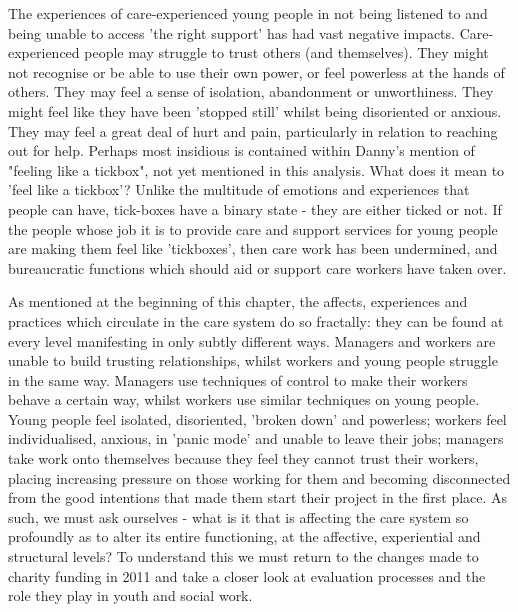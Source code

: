 The experiences of care-experienced young people in not being listened to and being unable to access 'the right support' has had vast negative impacts. Care-experienced people may struggle to trust others (and themselves). They might not recognise or be able to use their own power, or feel powerless at the hands of others. They may feel a sense of isolation, abandonment or unworthiness. They might feel like they have been 'stopped still' whilst being disoriented or anxious. They may feel a great deal of hurt and pain, particularly in relation to reaching out for help. Perhaps most insidious is contained within Danny's mention of "feeling like a tickbox", not yet mentioned in this analysis. What does it mean to 'feel like a tickbox'? Unlike the multitude of emotions and experiences that people can have, tick-boxes have a binary state - they are either ticked or not. If the people whose job it is to provide care and support services for young people are making them feel like 'tickboxes', then care work has been undermined, and bureaucratic functions which should aid or support care workers have taken over.

As mentioned at the beginning of this chapter, the affects, experiences and practices which circulate in the care system do so fractally: they can be found at every level manifesting in only subtly different ways. Managers and workers are unable to build trusting relationships, whilst workers and young people struggle in the same way. Managers use techniques of control to make their workers behave a certain way, whilst workers use similar techniques on young people. Young people feel isolated, disoriented, 'broken down' and powerless; workers feel individualised, anxious, in 'panic mode' and unable to leave their jobs; managers take work onto themselves because they feel they cannot trust their workers, placing increasing pressure on those working for them and becoming disconnected from the good intentions that made them start their project in the first place. As such, we must ask ourselves - what is it that is affecting the care system so profoundly as to alter its entire functioning, at the affective, experiential and structural levels? To understand this we must return to the changes made to charity funding in 2011 and take a closer look at evaluation processes and the role they play in youth and social work.

